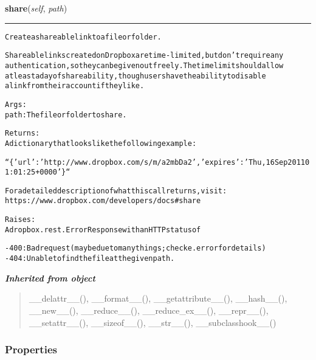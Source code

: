 \hspace{.8\funcindent}\begin{boxedminipage}{\funcwidth}

    \raggedright \textbf{share}(\textit{self}, \textit{path})

    \vspace{-1.5ex}

    \rule{\textwidth}{0.5\fboxrule}
\setlength{\parskip}{2ex}
\begin{alltt}
Create a shareable link to a file or folder.

Shareable links created on Dropbox are time-limited, but don't require any
authentication, so they can be given out freely. The time limit should allow
at least a day of shareability, though users have the ability to disable
a link from their account if they like.

Args:
    path: The file or folder to share.

Returns:
    A dictionary that looks like the following example:

    ``\{'url': 'http://www.dropbox.com/s/m/a2mbDa2', 'expires': 'Thu, 16 Sep 2011 01:01:25 +0000'\}``

    For a detailed description of what this call returns, visit:
    https://www.dropbox.com/developers/docs\#share

Raises:
    A dropbox.rest.ErrorResponse with an HTTP status of

    - 400: Bad request (may be due to many things; check e.error for details)
    - 404: Unable to find the file at the given path.
\end{alltt}

\setlength{\parskip}{1ex}
    \end{boxedminipage}


\large{\textbf{\textit{Inherited from object}}}

\begin{quote}
\_\_delattr\_\_(), \_\_format\_\_(), \_\_getattribute\_\_(), \_\_hash\_\_(), \_\_new\_\_(), \_\_reduce\_\_(), \_\_reduce\_ex\_\_(), \_\_repr\_\_(), \_\_setattr\_\_(), \_\_sizeof\_\_(), \_\_str\_\_(), \_\_subclasshook\_\_()
\end{quote}


  \subsubsection{Properties}

